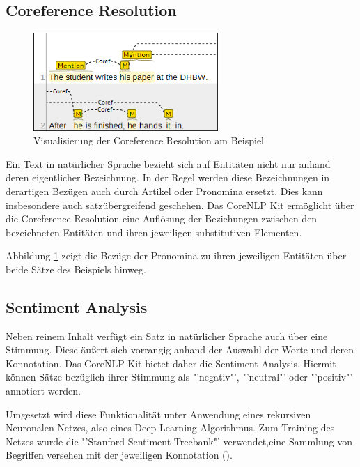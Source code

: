 \subsection{Coreference Resolution}
\begin{figure}
\includegraphics[width=7cm]{pictures/coref.png}
\caption{Visualisierung der Coreference Resolution am Beispiel}
\label{fig:COREF}
\end{figure}
Ein Text in natürlicher Sprache bezieht sich auf Entitäten nicht nur anhand deren eigentlicher Bezeichnung. In der Regel werden diese Bezeichnungen in derartigen Bezügen auch durch Artikel oder Pronomina ersetzt. Dies kann insbesondere auch satzübergreifend geschehen. Das CoreNLP Kit ermöglicht über die Coreference Resolution eine Auflösung der Beziehungen zwischen den bezeichneten Entitäten und ihren jeweiligen substitutiven Elementen.\par
Abbildung \ref{fig:COREF} zeigt die Bezüge der Pronomina zu ihren jeweiligen Entitäten über beide Sätze des Beispiels hinweg. 

\subsection{Sentiment Analysis}
Neben reinem Inhalt verfügt ein Satz in natürlicher Sprache auch über eine Stimmung. Diese äußert sich vorrangig anhand der Auswahl der Worte und deren Konnotation. Das CoreNLP Kit bietet daher die Sentiment Analysis. Hiermit können Sätze bezüglich ihrer Stimmung als "'negativ"', "'neutral"' oder "'positiv"' annotiert werden.\par
Umgesetzt wird diese Funktionalität unter Anwendung eines rekursiven Neuronalen Netzes, also eines Deep Learning Algorithmus. Zum Training des Netzes wurde die "'Stanford Sentiment Treebank"' verwendet,eine Sammlung von Begriffen versehen mit der jeweiligen Konnotation (\cite[vgl.][1]{SOCHERSENTIMENT}).

